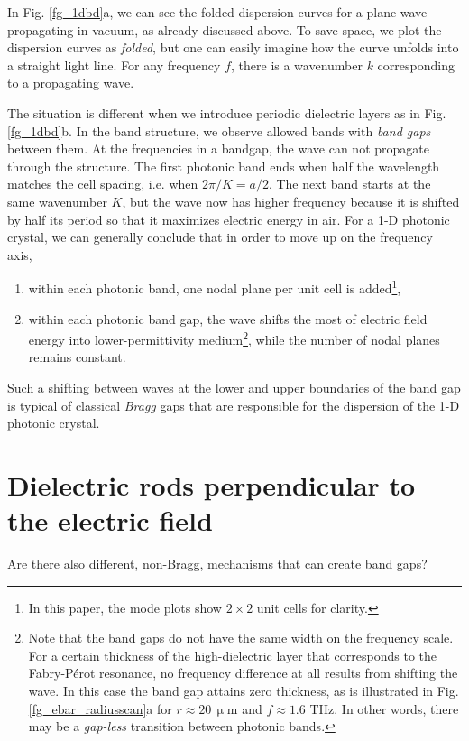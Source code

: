 \documentclass[letterpaper,12pt]{report}
\begin{document}
In Fig. \ref{fg_1dbd}a, we can see the folded dispersion curves for a plane wave propagating in vacuum, as already discussed above. 
To save space, we plot the  dispersion curves as \textit{folded}, but one can easily imagine how the curve unfolds into a straight light line. For any frequency $f$, there is a wavenumber $k$ corresponding to a propagating wave. 


The situation is different when we introduce periodic dielectric layers as in Fig. \ref{fg_1dbd}b. In the band structure, we observe allowed bands with \textit{band gaps} between them. At the frequencies in a bandgap, the wave can not propagate through the structure. The first photonic band ends when half the wavelength matches the cell spacing, i.e. when $2\pi / K= a/2$. The next band starts at the same wavenumber $K$, but the wave now has higher frequency because it is shifted by half its period so that it maximizes electric energy in air. For a 1-D photonic crystal, we can generally conclude that in order to move up on the frequency axis,
\begin{enumerate}
 \item{within each photonic band, one nodal plane per unit cell is added\footnote{In this paper, the mode plots show $2\times 2$ unit cells for clarity.},} 
 \item{within each photonic band gap, the wave shifts the most of electric field energy into lower-permittivity medium\footnote{Note that the band gaps do not have the same width on the frequency scale. For a certain thickness of the high-dielectric layer that corresponds to the Fabry-Pérot resonance, no frequency difference at all results from shifting the wave. In this case the band gap attains zero thickness, as is illustrated in Fig. \ref{fg_ebar_radiusscan}a for $r\approx20\,\upmu$m and $f\approx1.6$ THz. In other words, there may be a \textit{gap-less} transition between photonic bands.}, while the number of nodal planes remains constant. }
 \end{enumerate}

Such a shifting between waves at the lower and upper boundaries of the band gap is typical of classical \textit{Bragg} gaps that are responsible for the dispersion of the 1-D photonic crystal. 



\section{Dielectric rods perpendicular to the electric field}
Are there also different, non-Bragg, mechanisms that can create band gaps?
\end{document}

